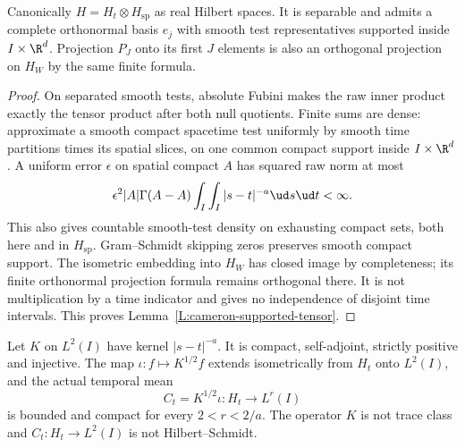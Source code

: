 \begin{lemma}\label{L:cameron-supported-tensor}
  Canonically $H=H_t\otimes H_{\mathrm{sp}}$ as real Hilbert spaces.
  It is separable and admits a complete orthonormal basis $e_j$
  with smooth test representatives supported inside $I\times\R^d$.
  Projection $P_J$ onto its first $J$ elements is also an
  orthogonal projection on $H_W$ by the same finite formula.
\end{lemma}

\begin{proof}
  On separated smooth tests, absolute Fubini makes the raw inner
  product exactly the tensor product after both null quotients.
  Finite sums are dense: approximate a smooth compact spacetime
  test uniformly by smooth time partitions times its spatial slices,
  on one common compact support inside $I\times\R^d$.
  A uniform error $\epsilon$ on spatial compact $A$ has squared
  raw norm at most
  \[
    \epsilon^2|A|\Gamma(A-A)
    \int_I\int_I|s-t|^{-a}\ud s\ud t<\infty.
  \]
  This also gives countable smooth-test density on exhausting
  compact sets, both here and in $H_{\mathrm{sp}}$.
  Gram--Schmidt skipping zeros preserves smooth compact support.
  The isometric embedding into $H_W$ has closed image by completeness;
  its finite orthonormal projection formula remains orthogonal there.
  It is not multiplication by a time indicator and gives no
  independence of disjoint time intervals.
  This proves Lemma~\ref{L:cameron-supported-tensor}.
\end{proof}

\begin{proposition}
  \label{P:cameron-temporal-map}
  Let $K$ on $L^2(I)$ have kernel $|s-t|^{-a}$.
  It is compact, self-adjoint, strictly positive and injective.
  The map $\iota:f\mapsto K^{1/2}f$ extends isometrically from
  $H_t$ onto $L^2(I)$, and the actual temporal mean
  \begin{equation}\label{E:cameron-temporal-map}
    C_t=K^{1/2}\iota:H_t\longrightarrow L^r(I)
  \end{equation}
  is bounded and compact for every $2<r<2/a$.
  The operator $K$ is not trace class and $C_t:H_t\to L^2(I)$
  is not Hilbert--Schmidt.
\end{proposition}

